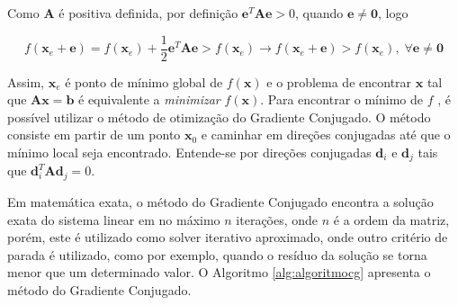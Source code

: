 Como $\mathbf{A}$ é positiva definida, por definição $\mathbf{e}^T\mathbf{A}\mathbf{e}  > 0$, quando $\mathbf{e}\neq \mathbf{0}$, logo

\begin{equation}
    f(\mathbf{x}_e + \mathbf{e}) = f(\mathbf{x}_e) + \frac{1}{2}  \mathbf{e}^T\mathbf{A}\mathbf{e} > f(\mathbf{x}_e)\rightarrow  f(\mathbf{x}_e + \mathbf{e}) > f(\mathbf{x}_e),\; \forall \mathbf{e} \neq \mathbf{0}
\end{equation}


Assim, $\mathbf{x}_e$ é ponto de mínimo global de $f(\mathbf{x})$ e o problema de encontrar $\mathbf{x}$ tal que $\mathbf{A}\mathbf{x} = \mathbf{b}$ é equivalente a \textit{minimizar} $f(\mathbf{x})$. Para encontrar o mínimo de $f$ , é possível utilizar o método de otimização do Gradiente Conjugado. O método consiste em partir de um ponto $\mathbf{x}_0$ e caminhar em direções conjugadas até que o mínimo local seja encontrado. Entende-se por direções conjugadas $\mathbf{d}_i$ e $\mathbf{d}_j$ tais que $\mathbf{d}_i^T\mathbf{A}\mathbf{d}_j=0$. 

Em matemática exata, o método do Gradiente Conjugado encontra a solução exata do sistema linear em no máximo $n$ iterações, onde $n$ é a ordem da matriz, porém, este é utilizado como solver iterativo aproximado, onde outro critério de parada é utilizado, como por exemplo, quando o resíduo  da solução se torna menor que um determinado valor. O Algoritmo \ref{alg:algoritmocg} apresenta o método do Gradiente Conjugado. 


